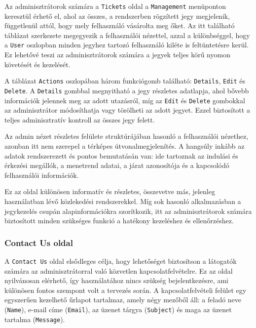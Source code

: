 Az adminisztrátorok számára a \texttt{Tickets} oldal a \texttt{Management} menüponton keresztül érhető el, ahol az összes, a rendszerben rögzített jegy megjelenik, függetlenül attól, hogy mely felhasználó vásárolta meg őket. Az itt található táblázat szerkezete megegyezik a felhasználói nézettel, azzal a különbséggel, hogy a \texttt{User} oszlopban minden jegyhez tartozó felhasználó kiléte is feltüntetésre kerül. Ez lehetővé teszi az adminisztrátorok számára a jegyek teljes körű nyomon követését és kezelését.

A táblázat \texttt{Actions} oszlopában három funkciógomb található: \texttt{Details}, \texttt{Edit} és \texttt{Delete}. A \texttt{Details} gombbal megnyitható a jegy részletes adatlapja, ahol bővebb információk jelennek meg az adott utazásról, míg az \texttt{Edit} és \texttt{Delete} gombokkal az adminisztrátor módosíthatja vagy törölheti az adott jegyet. Ezzel biztosított a teljes adminisztratív kontroll az összes jegy felett.

Az admin nézet részletes felülete struktúrájában hasonló a felhasználói nézethez, azonban itt nem szerepel a térképes útvonalmegjelenítés. A hangsúly inkább az adatok rendszerezett és pontos bemutatásán van: ide tartoznak az indulási és érkezési megállók, a menetrend adatai, a járat azonosítója és a kapcsolódó felhasználói információk.

Ez az oldal különösen informatív és részletes, összevetve más, jelenleg használatban lévő közlekedési rendszerekkel. Míg sok hasonló alkalmazásban a jegykezelés csupán alapinformációkra szorítkozik, itt az adminisztrátorok számára biztosított minden szükséges funkció a hatékony kezeléshez és ellenőrzéshez.



\subsubsection{Contact Us oldal}

A \texttt{Contact Us} oldal elsődleges célja, hogy lehetőséget biztosítson a látogatók számára az adminisztrátorral való közvetlen kapcsolatfelvételre. Ez az oldal nyilvánosan elérhető, így használatához nincs szükség bejelentkezésre, ami különösen fontos szempont volt a tervezés során. A kapcsolatfelvételi felület egy egyszerűen kezelhető űrlapot tartalmaz, amely négy mezőből áll: a feladó neve (\texttt{Name}), e-mail címe (\texttt{Email}), az üzenet tárgya (\texttt{Subject}) és maga az üzenet tartalma (\texttt{Message}).

